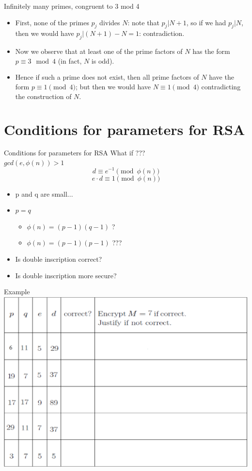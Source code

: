 \documentclass{beamer}
\begin{document}
\begin{frame}{Infinitely many primes, congruent to 3 mod 4}
    \begin{itemize}
        \item First, none of the primes $p_j$ divides $N$: note that $p_j | N + 1$, so if we had $p_j | N$, then we would have $p_j |(N + 1) - N = 1$: contradiction.
        \item Now we observe that at least one of the prime factors of $N$ has the form $p \equiv 3 \mod 4$ (in fact, $N$ is odd).
        \item Hence if such a prime does not exist, then all prime factors of $N$ have the form $p \equiv 1 \pmod 4$; but then we would have $N \equiv 1 \pmod 4$ contradicting the construction of $N$. 
    \end{itemize}
\end{frame}

\section{Conditions for parameters for RSA}

\begin{frame}{Conditions for parameters for RSA}
    What if ??? \\
    $gcd(e, \phi(n)) > 1$ 
    $$d \equiv e^{-1} \pmod{ \phi(n)}$$
    $$e \cdot d \equiv 1 \pmod{\phi(n)}$$
    \begin{itemize}
        \item p and q are small...
        \item $p = q$
        \begin{itemize}
            \item $\phi(n) = (p-1)(q-1)$ ?
            \item $\phi(n) = (p-1)(p-1)$ ???
        \end{itemize}
        \item Is double inscription correct?
        \item Is double inscription more secure?
    \end{itemize}
\end{frame}

\begin{frame}{Example}
    \centering
    \includegraphics[width=.7\linewidth]{1.png}
\end{frame}
\end{document}
